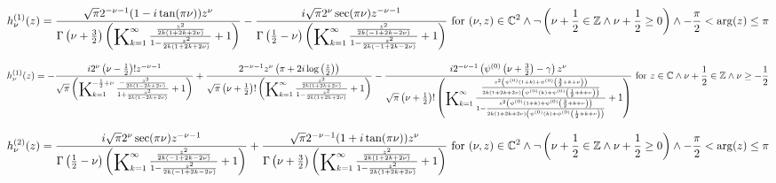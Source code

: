 \documentclass{article}
\newcommand{\bigK}{\mathop{\raisebox{-5pt}{\huge K}}}
\begin{document}
\[h_{\nu }^{(1)}(z)=\frac{\sqrt{\pi } 2^{-\nu -1} (1-i \tan (\pi  \nu )) z^{\nu }}{\Gamma \left(\nu +\frac{3}{2}\right) \left(\bigK_{k=1}^{\infty}\frac{\frac{z^2}{2 k (1+2 k+2 \nu )}}{1-\frac{z^2}{2 k (1+2 k+2 \nu )}}+1\right)}-\frac{i \sqrt{\pi } 2^{\nu } \sec (\pi  \nu ) z^{-\nu -1}}{\Gamma \left(\frac{1}{2}-\nu \right) \left(\bigK_{k=1}^{\infty}\frac{\frac{z^2}{2 k (-1+2 k-2 \nu )}}{1-\frac{z^2}{2 k (-1+2 k-2 \nu )}}+1\right)}\text{ for }(\nu ,z)\in \mathbb{C}^2\land \neg \left(\nu +\frac{1}{2}\in \mathbb{Z}\land \nu +\frac{1}{2}\geq 0\right)\land -\frac{\pi }{2}<\arg (z)\leq \pi\] 

\[h_{\nu }^{(1)}(z)=-\frac{i 2^{\nu } \left(\nu -\frac{1}{2}\right)! z^{-\nu -1}}{\sqrt{\pi } \left(\bigK_{k=1}^{-\frac{1}{2}+\nu}\frac{-\frac{z^2}{2 k (1-2 k+2 \nu )}}{1+\frac{z^2}{2 k (1-2 k+2 \nu )}}+1\right)}+\frac{2^{-\nu -1} z^{\nu } \left(\pi +2 i \log \left(\frac{z}{2}\right)\right)}{\sqrt{\pi } \left(\nu +\frac{1}{2}\right)! \left(\bigK_{k=1}^{\infty}\frac{\frac{z^2}{2 k (1+2 k+2 \nu )}}{1-\frac{z^2}{2 k (1+2 k+2 \nu )}}+1\right)}-\frac{i 2^{-\nu -1} \left(\psi ^{(0)}\left(\nu +\frac{3}{2}\right)-\gamma \right) z^{\nu }}{\sqrt{\pi } \left(\nu +\frac{1}{2}\right)! \left(\bigK_{k=1}^{\infty}\frac{\frac{z^2 \left(\psi ^{(0)}(1+k)+\psi ^{(0)}\left(\frac{3}{2}+k+\nu \right)\right)}{2 k (1+2 k+2 \nu ) \left(\psi ^{(0)}(k)+\psi ^{(0)}\left(\frac{1}{2}+k+\nu \right)\right)}}{1-\frac{z^2 \left(\psi ^{(0)}(1+k)+\psi ^{(0)}\left(\frac{3}{2}+k+\nu \right)\right)}{2 k (1+2 k+2 \nu ) \left(\psi ^{(0)}(k)+\psi ^{(0)}\left(\frac{1}{2}+k+\nu \right)\right)}}+1\right)}\text{ for }z\in \mathbb{C}\land \nu +\frac{1}{2}\in \mathbb{Z}\land \nu \geq -\frac{1}{2}\] 

\[h_{\nu }^{(2)}(z)=\frac{i \sqrt{\pi } 2^{\nu } \sec (\pi  \nu ) z^{-\nu -1}}{\Gamma \left(\frac{1}{2}-\nu \right) \left(\bigK_{k=1}^{\infty}\frac{\frac{z^2}{2 k (-1+2 k-2 \nu )}}{1-\frac{z^2}{2 k (-1+2 k-2 \nu )}}+1\right)}+\frac{\sqrt{\pi } 2^{-\nu -1} (1+i \tan (\pi  \nu )) z^{\nu }}{\Gamma \left(\nu +\frac{3}{2}\right) \left(\bigK_{k=1}^{\infty}\frac{\frac{z^2}{2 k (1+2 k+2 \nu )}}{1-\frac{z^2}{2 k (1+2 k+2 \nu )}}+1\right)}\text{ for }(\nu ,z)\in \mathbb{C}^2\land \neg \left(\nu +\frac{1}{2}\in \mathbb{Z}\land \nu +\frac{1}{2}\geq 0\right)\land -\frac{\pi }{2}<\arg (z)\leq \pi\] 
\end{document}
